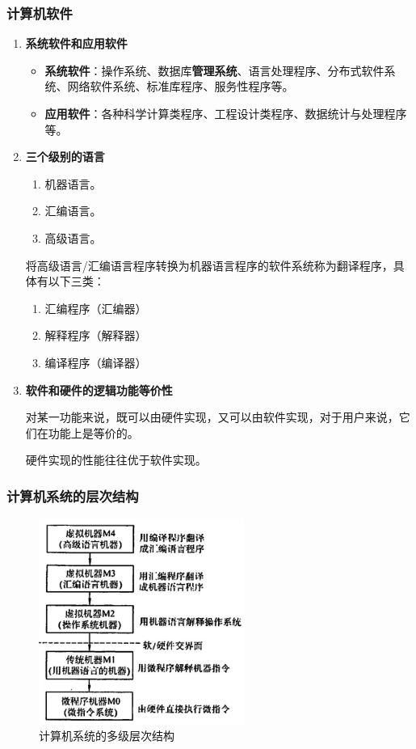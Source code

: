 \documentclass[12pt, a4paper, oneside]{ctexart}
\begin{document}
\subsubsection{计算机软件}

\begin{enumerate}
  \item {\bf 系统软件和应用软件}
  
  \begin{itemize}
    \item {\bf 系统软件}：操作系统、数据库\textbf{管理系统}、语言处理程序、分布式软件系统、网络软件系统、标准库程序、服务性程序等。
    \item {\bf 应用软件}：各种科学计算类程序、工程设计类程序、数据统计与处理程序等。
  \end{itemize}

  \item {\bf 三个级别的语言}
  \begin{enumerate}
    \item 机器语言。
    \item 汇编语言。
    \item 高级语言。
  \end{enumerate}
  将高级语言/汇编语言程序转换为机器语言程序的软件系统称为翻译程序，具体有以下三类：
  \begin{enumerate}
    \item 汇编程序（汇编器）
    \item 解释程序（解释器）
    \item 编译程序（编译器）
  \end{enumerate}
  \item {\bf 软件和硬件的逻辑功能等价性}

  对某一功能来说，既可以由硬件实现，又可以由软件实现，对于用户来说，它们在功能上是等价的。

  硬件实现的性能往往优于软件实现。
\end{enumerate}

\subsubsection{计算机系统的层次结构}

\begin{figure}[h]
  \centering
  \includegraphics[width=0.6\textwidth]{./images/computer_system_layer.jpg}
  \caption{计算机系统的多级层次结构}
  \label{computer_system_layer}
\end{figure}
\end{document}
